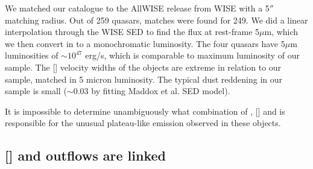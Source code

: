 We matched our catalogue to the AllWISE release from WISE with a 5$''$ matching radius. 
Out of 259 quasars, matches were found for 249. 
We did a linear interpolation through the WISE SED to find the flux at rest-frame 5$\mu$m, which we then convert in to a monochromatic luminosity. 
The four \citet{zakamska16} quasars have 5$\mu$m luminosities of $\sim10^{47}$ erg/s, which is comparable to maximum luminosity of our sample.
The [] velocity widths of the \citet{zakamska16} objects are extreme in relation to our sample, matched in 5 micron luminosity. 
The typical dust reddening in our sample is small ($\sim$0.03 by fitting Maddox et al. SED model). 

It is impossible to determine unambiguously what combination of \hb, [] and  is responsible for the unusual plateau-like emission observed in these objects. 

\subsection{[] and  outflows are linked}


